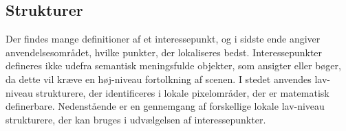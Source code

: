 \subsection{Strukturer}
Der findes mange definitioner af et interessepunkt, og i sidste ende angiver anvendelsesområdet, hvilke punkter, der lokaliseres bedst.
Interessepunkter defineres ikke udefra semantisk meningsfulde objekter, som ansigter eller bøger, da dette vil kræve en høj-niveau fortolkning af scenen. I stedet anvendes lav-niveau strukturere, der identificeres i lokale pixelområder, der er matematisk definerbare. Nedenstående er en gennemgang af forskellige lokale lav-niveau strukturere, der kan bruges i udvælgelsen af interessepunkter.

